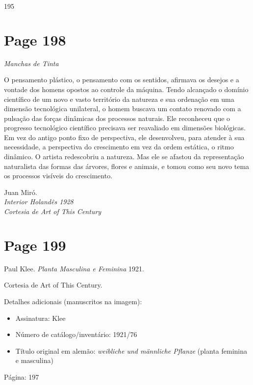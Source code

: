 \documentclass[a4paper]{article}
\begin{document}
195

\newpage
\section*{Page 198}

\noindent \textit{Manchas de Tinta}\par

\vspace{1em} %

\noindent O pensamento plástico, o pensamento com os sentidos, afirmava os desejos e a vontade dos homens opostos ao controle da máquina. Tendo alcançado o domínio científico de um novo e vasto território da natureza e sua ordenação em uma dimensão tecnológica unilateral, o homem buscava um contato renovado com a pulsação das forças dinâmicas dos processos naturais. Ele reconheceu que o progresso tecnológico científico precisava ser reavaliado em dimensões biológicas. Em vez do antigo ponto fixo de perspectiva, ele desenvolveu, para atender à sua necessidade, a perspectiva do crescimento em vez da ordem estática, o ritmo dinâmico. O artista redescobriu a natureza. Mas ele se afastou da representação naturalista das formas das árvores, flores e animais, e tomou como seu novo tema os processos visíveis do crescimento.\par

\vspace{1em} %

\noindent Juan Miró.\\
\textit{Interior Holandês 1928}\\
\textit{Cortesia de Art of This Century}\par

\vfill
{}

\newpage
\section*{Page 199}

\noindent Paul Klee. \textit{Planta Masculina e Feminina} 1921.
\par
\noindent Cortesia de Art of This Century.
\par
\noindent Detalhes adicionais (manuscritos na imagem):
\begin{itemize}
    \item Assinatura: Klee
    \item Número de catálogo/inventário: 1921/76
    \item Título original em alemão: \textit{weibliche und männliche Pflanze} (planta feminina e masculina)
\end{itemize}
\par
\noindent Página: 197
\end{document}
